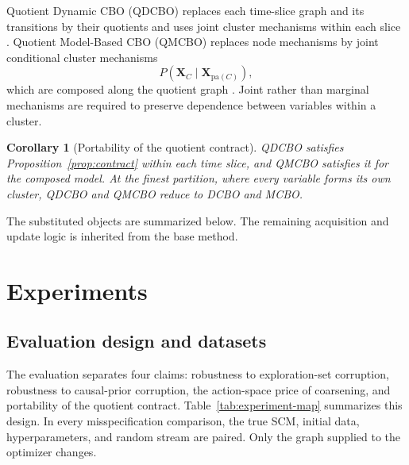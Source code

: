 \documentclass[twoside]{article}
\newtheorem{corollary}{Corollary}
\begin{document}
Quotient Dynamic CBO (QDCBO) replaces each time-slice graph and its transitions by their quotients and uses joint cluster mechanisms within each slice \citep{agliettiDynamicCausalBayesian2021a}. Quotient Model-Based CBO (QMCBO) replaces node mechanisms by joint conditional cluster mechanisms
\[
 P(\mathbf X_C\mid\mathbf X_{\mathrm{pa}(C)}),
\]
which are composed along the quotient graph
\citep{sussexMODELBASEDCAUSALBAYESIAN2023}. Joint rather than marginal
mechanisms are required to preserve dependence between variables within a
cluster.

\begin{corollary}[Portability of the quotient contract]
\label{cor:portability}
QDCBO satisfies Proposition~\ref{prop:contract} within each time slice, and QMCBO satisfies it for the composed model. At the finest partition, where every variable forms its own cluster, QDCBO and QMCBO reduce to DCBO and MCBO.
\end{corollary}

The substituted objects are summarized below. The remaining acquisition and update logic is inherited from the base method.

\begin{center}
\small
{}
\end{center}

\section{Experiments}
\label{sec:experiments}

\subsection{Evaluation design and datasets}
\label{sec:exp-design}

The evaluation separates four claims: robustness to exploration-set corruption, robustness to causal-prior corruption, the action-space price of coarsening, and portability of the quotient contract. Table~\ref{tab:experiment-map} summarizes this design. In every misspecification comparison, the true SCM, initial data, hyperparameters, and random stream are paired. Only the graph supplied to the optimizer changes.
\end{document}
